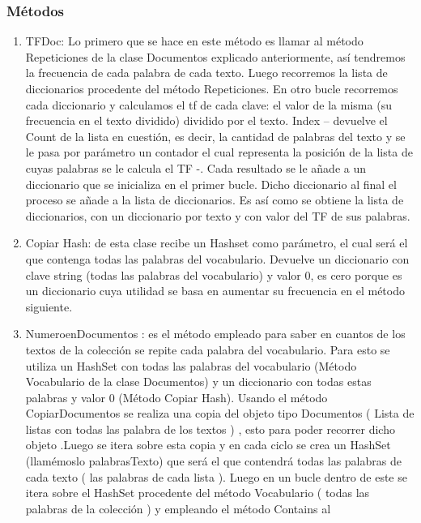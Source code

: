 \documentclass[10pt]{extarticle}
\begin{document}
    \subsubsection{Métodos}
   
   \begin{enumerate}
    
   \item  TFDoc: Lo primero que se hace en este método es llamar al método Repeticiones de la 
   clase Documentos explicado anteriormente, así tendremos la frecuencia de 
   cada palabra de cada texto. Luego recorremos la lista de diccionarios procedente del método 
   Repeticiones. En otro bucle recorremos cada diccionario y calculamos el tf de cada clave: el valor 
   de la misma (su frecuencia en el texto dividido) dividido por el texto. Index – devuelve el Count de 
   la lista en cuestión, es decir, la cantidad de palabras del texto y se le pasa por parámetro un 
   contador el cual representa la posición de la lista de cuyas palabras se le calcula el TF -. Cada 
   resultado se le añade a un diccionario que se inicializa en el primer bucle. Dicho diccionario al final 
   el proceso se añade a la lista de diccionarios. Es así como se obtiene la lista de diccionarios, con un 
   diccionario por texto y con valor del TF de sus palabras. 
   \item Copiar Hash: de esta clase recibe un Hashset como parámetro, el cual será el que 
   contenga todas las palabras del vocabulario. Devuelve un diccionario con clave string (todas las 
   palabras del vocabulario) y valor 0, es cero porque es un diccionario cuya utilidad se basa en 
   aumentar su frecuencia en el método siguiente. 
   \item NumeroenDocumentos : es el método empleado para saber en cuantos de los textos de 
   la colección se repite cada palabra del vocabulario. Para esto se utiliza un HashSet con todas las 
   palabras del vocabulario (Método Vocabulario de la clase Documentos) y un diccionario con todas 
   estas palabras y valor 0 (Método Copiar Hash). Usando el método CopiarDocumentos se realiza 
   una copia del objeto tipo Documentos ( Lista de listas con todas las palabra de los textos ) , esto 
   para poder recorrer dicho objeto .Luego se itera sobre esta copia y en cada ciclo se crea un 
   HashSet (llamémoslo palabrasTexto) que será el que contendrá todas las palabras de cada texto ( 
   las palabras de cada lista ). Luego en un bucle dentro de este se itera sobre el HashSet procedente 
   del método Vocabulario ( todas las palabras de la colección ) y empleando el método Contains al 

\end{enumerate}
\end{document}
